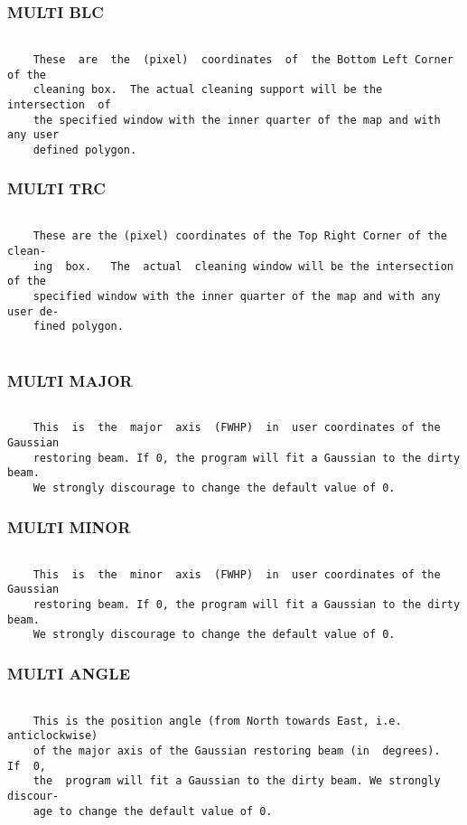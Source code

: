 \subsubsection{MULTI BLC}
\begin{verbatim}

    These  are  the  (pixel)  coordinates  of  the Bottom Left Corner of the
    cleaning box.  The actual cleaning support will be the  intersection  of
    the specified window with the inner quarter of the map and with any user
    defined polygon.

\end{verbatim}
\subsubsection{MULTI TRC}
\begin{verbatim}

    These are the (pixel) coordinates of the Top Right Corner of the  clean-
    ing  box.   The  actual  cleaning window will be the intersection of the
    specified window with the inner quarter of the map and with any user de-
    fined polygon.


\end{verbatim}
\subsubsection{MULTI MAJOR}
\begin{verbatim}

    This  is  the  major  axis  (FWHP)  in  user coordinates of the Gaussian
    restoring beam. If 0, the program will fit a Gaussian to the dirty beam.
    We strongly discourage to change the default value of 0.

\end{verbatim}
\subsubsection{MULTI MINOR}
\begin{verbatim}

    This  is  the  minor  axis  (FWHP)  in  user coordinates of the Gaussian
    restoring beam. If 0, the program will fit a Gaussian to the dirty beam.
    We strongly discourage to change the default value of 0.

\end{verbatim}
\subsubsection{MULTI ANGLE}
\begin{verbatim}

    This is the position angle (from North towards East, i.e. anticlockwise)
    of the major axis of the Gaussian restoring beam (in  degrees).   If  0,
    the  program will fit a Gaussian to the dirty beam. We strongly discour-
    age to change the default value of 0.

\end{verbatim}
